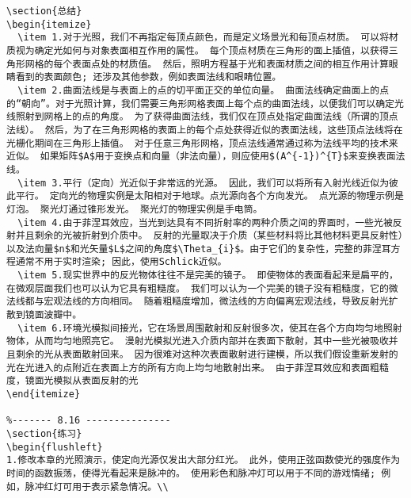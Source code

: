 \begin{lstlisting}
\section{总结}
\begin{itemize}
  \item 1.对于光照，我们不再指定每顶点颜色，而是定义场景光和每顶点材质。 可以将材质视为确定光如何与对象表面相互作用的属性。 每个顶点材质在三角形的面上插值，以获得三角形网格的每个表面点处的材质值。 然后，照明方程基于光和表面材质之间的相互作用计算眼睛看到的表面颜色; 还涉及其他参数，例如表面法线和眼睛位置。
  \item 2.曲面法线是与表面上的点的切平面正交的单位向量。 曲面法线确定曲面上的点的“朝向”。对于光照计算，我们需要三角形网格表面上每个点的曲面法线，以便我们可以确定光线照射到网格上的点的角度。 为了获得曲面法线，我们仅在顶点处指定曲面法线（所谓的顶点法线）。 然后，为了在三角形网格的表面上的每个点处获得近似的表面法线，这些顶点法线将在光栅化期间在三角形上插值。 对于任意三角形网格，顶点法线通常通过称为法线平均的技术来近似。 如果矩阵$A$用于变换点和向量（非法向量），则应使用$(A^{-1})^{T}$来变换表面法线。
  \item 3.平行（定向）光近似于非常远的光源。 因此，我们可以将所有入射光线近似为彼此平行。 定向光的物理实例是太阳相对于地球。点光源向各个方向发光。 点光源的物理示例是灯泡。 聚光灯通过锥形发光。 聚光灯的物理实例是手电筒。
  \item 4.由于菲涅耳效应，当光到达具有不同折射率的两种介质之间的界面时，一些光被反射并且剩余的光被折射到介质中。 反射的光量取决于介质（某些材料将比其他材料更具反射性）以及法向量$n$和光矢量$L$之间的角度$\Theta_{i}$。由于它们的复杂性，完整的菲涅耳方程通常不用于实时渲染; 因此，使用Schlick近似。
  \item 5.现实世界中的反光物体往往不是完美的镜子。 即使物体的表面看起来是扁平的，在微观层面我们也可以认为它具有粗糙度。 我们可以认为一个完美的镜子没有粗糙度，它的微法线都与宏观法线的方向相同。 随着粗糙度增加，微法线的方向偏离宏观法线，导致反射光扩散到镜面波瓣中。
  \item 6.环境光模拟间接光，它在场景周围散射和反射很多次，使其在各个方向均匀地照射物体，从而均匀地照亮它。 漫射光模拟光进入介质内部并在表面下散射，其中一些光被吸收并且剩余的光从表面散射回来。 因为很难对这种次表面散射进行建模，所以我们假设重新发射的光在光进入的点附近在表面上方的所有方向上均匀地散射出来。 由于菲涅耳效应和表面粗糙度，镜面光模拟从表面反射的光
\end{itemize}

%------- 8.16 ---------------
\section{练习}
\begin{flushleft}
1.修改本章的光照演示，使定向光源仅发出大部分红光。 此外，使用正弦函数使光的强度作为时间的函数振荡，使得光看起来是脉冲的。 使用彩色和脉冲灯可以用于不同的游戏情绪; 例如，脉冲红灯可用于表示紧急情况。\\


\end{lstlisting}
